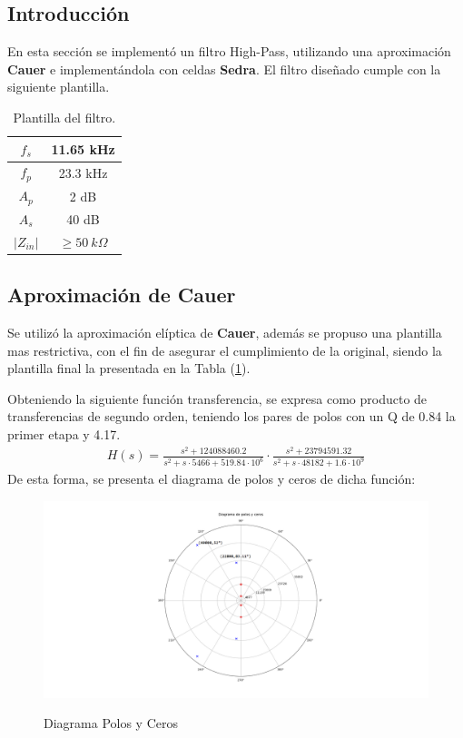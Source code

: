 


\subsection{Introducción}

En esta sección se implementó un filtro High-Pass, utilizando una aproximación \textbf{Cauer} e implementándola con celdas \textbf{Sedra}. El filtro diseñado cumple con la siguiente plantilla.
\begin{table}[H]
\centering
\begin{tabular}{|c|c|}
\hline
$f_s$      & 11.65 kHz          \\ \hline
$f_p$      & 23.3 kHz           \\ \hline
$A_p$      & 2 dB               \\ \hline
$A_s$      & 40 dB              \\ \hline
$|Z_{in}|$ & $\geq 50 \ k \Omega$ \\ \hline
\end{tabular}
\caption{Plantilla del filtro.}
\label{tab:plantilla}
\end{table}
\subsection{Aproximación de Cauer}
Se utilizó la aproximación elíptica de \textbf{Cauer}, además se propuso una plantilla mas restrictiva, con el fin de asegurar el cumplimiento de la original, siendo la plantilla final la presentada en la Tabla (\ref{tab:plantilla}).

Obteniendo la siguiente función transferencia, se expresa como producto de transferencias de segundo orden, teniendo los pares de polos con un Q de 0.84 la primer etapa y 4.17.
\begin{align}
	H(s)=\frac{ {s}^{2}+ 124088460.2 
 }{s^2+s\cdot 5466 + 519.84\cdot 10^6 } \cdot \frac{  {s}^{2}+
 23794591.32 }{s^2+s\cdot 48182 + 1.6\cdot 10^9 }
\label{eq:trans}
\end{align}
De esta forma, se presenta el diagrama de polos y ceros de dicha función:
\begin{figure}[H]
	\centering
	\includegraphics[width=\textwidth]{Imagenes-Ej3/DiagramaPolosYCeros.png}
	\label{fig:poleZeroDiag}
	\caption{Diagrama Polos y Ceros}
\end{figure}

